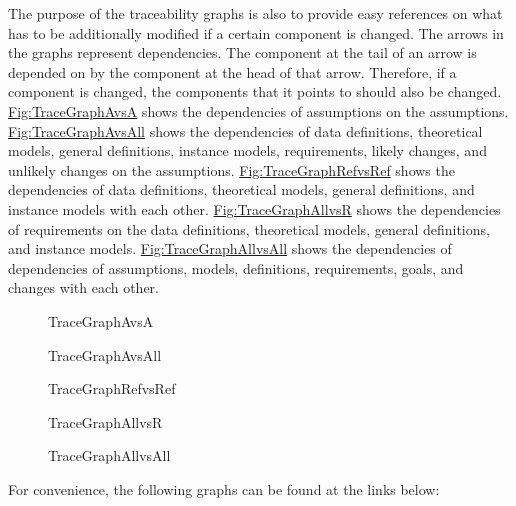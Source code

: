 \documentclass[12pt]{article}
\begin{document}
The purpose of the traceability graphs is also to provide easy references on what has to be additionally modified if a certain component is changed. The arrows in the graphs represent dependencies. The component at the tail of an arrow is depended on by the component at the head of that arrow. Therefore, if a component is changed, the components that it points to should also be changed. \hyperref[Figure:TraceGraphAvsA]{Fig:TraceGraphAvsA} shows the dependencies of assumptions on the assumptions. \hyperref[Figure:TraceGraphAvsAll]{Fig:TraceGraphAvsAll} shows the dependencies of data definitions, theoretical models, general definitions, instance models, requirements, likely changes, and unlikely changes on the assumptions. \hyperref[Figure:TraceGraphRefvsRef]{Fig:TraceGraphRefvsRef} shows the dependencies of data definitions, theoretical models, general definitions, and instance models with each other. \hyperref[Figure:TraceGraphAllvsR]{Fig:TraceGraphAllvsR} shows the dependencies of requirements on the data definitions, theoretical models, general definitions, and instance models. \hyperref[Figure:TraceGraphAllvsAll]{Fig:TraceGraphAllvsAll} shows the dependencies of dependencies of assumptions, models, definitions, requirements, goals, and changes with each other.

\begin{figure}
\begin{center}

\caption{TraceGraphAvsA}
\label{Figure:TraceGraphAvsA}
\end{center}
\end{figure}
\begin{figure}
\begin{center}

\caption{TraceGraphAvsAll}
\label{Figure:TraceGraphAvsAll}
\end{center}
\end{figure}
\begin{figure}
\begin{center}

\caption{TraceGraphRefvsRef}
\label{Figure:TraceGraphRefvsRef}
\end{center}
\end{figure}
\begin{figure}
\begin{center}

\caption{TraceGraphAllvsR}
\label{Figure:TraceGraphAllvsR}
\end{center}
\end{figure}
\begin{figure}
\begin{center}

\caption{TraceGraphAllvsAll}
\label{Figure:TraceGraphAllvsAll}
\end{center}
\end{figure}
For convenience, the following graphs can be found at the links below:
\end{document}
